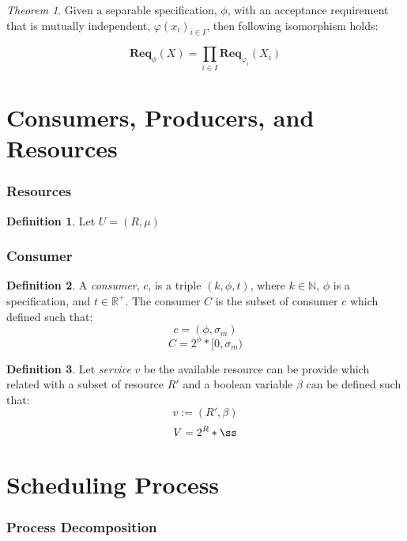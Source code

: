 \documentclass{article}
\theoremstyle{definition}
\newtheorem{definition}{Definition}[part]
\theoremstyle{remark}
\newtheorem*{theorem}{Theorem}
\theoremstyle{definition}
\newcommand{\reqop}[2]{\mathbf{Req}_{#1}(#2)}
\begin{document}
                \begin{theorem}
                    Given a separable specification, $\phi$, with an acceptance requirement that is mutually independent,
                    $\varphi(x_i)_{i \in I}$, then following isomorphism holds:

                    \[
                    \reqop{\phi}{X} = \prod_{i \in I}\reqop{\varphi_{i}}{X_{i}}
                    \]
                \end{theorem}
			
	\part{Consumers, Producers, and Resources}
		\section{Resources}
		
			\begin{definition}
				Let $U = (R, \mu)$ 
				
			\end{definition}
		
		\section{Consumer}
		
			\begin{definition}
				A \emph{consumer}, $c$, is a triple $(k, \phi, t)$, where $k \in \mathbb{N}$, $\phi$ is a specification, and $t \in \mathbb{R}^{+}$. The consumer $C$ is the subset of consumer $c$ which defined such that:
				\[
				c = (\phi , \sigma_m)
				\]
				\[
				C = 2^{\phi}*[0,\sigma_m)
				\]
			
			\end{definition}
		
			\begin{definition}
				Let \emph{service} $v$ be the available resource can be provide which related with a subset of resource $R'$ and a boolean variable $\beta$ can be defined such that:
				\[
				v := (R', \beta)
				\]
				\[
				V = 2^{R}*{\ss}
				\]
			\end{definition}
	
	\part{Scheduling Process}
	
	\section{Process Decomposition}
		
\end{document}
